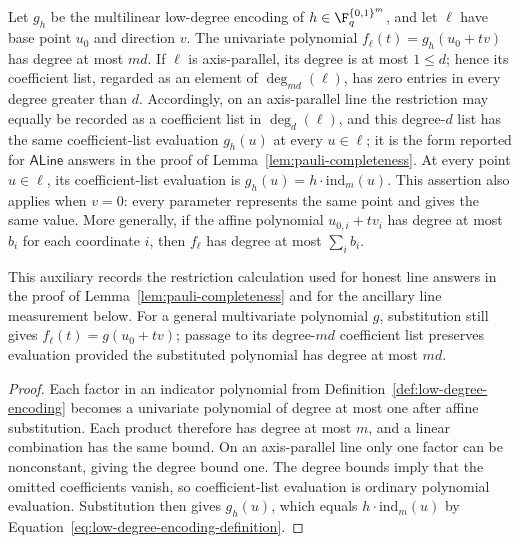 \begin{lemma}
	\label{lem:low-degree-encoding-line-restriction}
	\leanok
	Let $g_h$ be the multilinear low-degree encoding of
	$h\in\F_q^{\{0,1\}^m}$, and let $\ell$ have base point $u_0$ and
	direction $v$. The univariate polynomial
	$f_\ell(t)=g_h(u_0+tv)$ has degree at most $md$.
	If $\ell$ is axis-parallel, its degree is at most $1\leq d$; hence its
	coefficient list, regarded as an element of $\deg_{md}(\ell)$, has
	zero entries in every degree greater than $d$.
	Accordingly, on an axis-parallel line the restriction may equally be
	recorded as a coefficient list in $\deg_{d}(\ell)$, and this degree-$d$
	list has the same coefficient-list evaluation $g_h(u)$ at every
	$u\in\ell$; it is the form reported for $\mathsf{ALine}$ answers in the
	proof of Lemma~\ref{lem:pauli-completeness}.
	At every point $u\in\ell$, its coefficient-list evaluation is
	$g_h(u)=h\cdot\mathrm{ind}_m(u)$. This assertion also applies when
	$v=0$: every parameter represents the same point and gives the same
	value.
	More generally, if the affine polynomial $u_{0,i}+tv_i$ has degree
	at most $b_i$ for each coordinate $i$, then $f_\ell$ has degree at
	most $\sum_i b_i$.

	This auxiliary records the restriction calculation used for honest line
	answers in the proof of Lemma~\ref{lem:pauli-completeness} and for the
	ancillary line measurement below. For a general multivariate polynomial
	$g$, substitution still gives
	$f_\ell(t)=g(u_0+tv)$; passage to its degree-$md$ coefficient list
	preserves evaluation provided the substituted polynomial has degree at
	most $md$.
\end{lemma}

\begin{proof}
	\leanok
	Each factor in an indicator polynomial from
	Definition~\ref{def:low-degree-encoding} becomes a univariate polynomial
	of degree at most one after affine substitution. Each product therefore
	has degree at most $m$, and a linear combination has the same bound.
	On an axis-parallel line only one factor can be nonconstant, giving the
	degree bound one. The degree bounds imply that the omitted coefficients
	vanish, so coefficient-list evaluation is ordinary polynomial
	evaluation. Substitution then gives $g_h(u)$, which equals
	$h\cdot\mathrm{ind}_m(u)$ by
	Equation~\eqref{eq:low-degree-encoding-definition}.
\end{proof}

